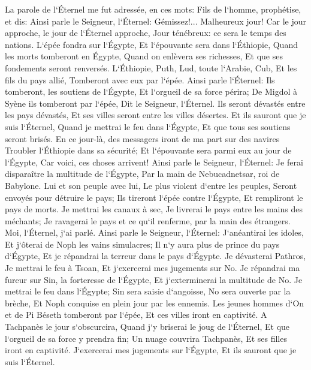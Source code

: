 \verse La parole de l`Éternel me fut adressée, en ces mots: 
\verse Fils de l`homme, prophétise, et dis: Ainsi parle le Seigneur, l`Éternel: Gémissez!... Malheureux jour! 
\verse Car le jour approche, le jour de l`Éternel approche, Jour ténébreux: ce sera le temps des nations. 
\verse L`épée fondra sur l`Égypte, Et l`épouvante sera dans l`Éthiopie, Quand les morts tomberont en Égypte, Quand on enlèvera ses richesses, Et que ses fondements seront renversés. 
\verse L`Éthiopie, Puth, Lud, toute l`Arabie, Cub, Et les fils du pays allié, Tomberont avec eux par l`épée. 
\verse Ainsi parle l`Éternel: Ils tomberont, les soutiens de l`Égypte, Et l`orgueil de sa force périra; De Migdol à Syène ils tomberont par l`épée, Dit le Seigneur, l`Éternel. 
\verse Ils seront dévastés entre les pays dévastés, Et ses villes seront entre les villes désertes. 
\verse Et ils sauront que je suis l`Éternel, Quand je mettrai le feu dans l`Égypte, Et que tous ses soutiens seront brisés. 
\verse En ce jour-là, des messagers iront de ma part sur des navires Troubler l`Éthiopie dans sa sécurité; Et l`épouvante sera parmi eux au jour de l`Égypte, Car voici, ces choses arrivent! 
\verse Ainsi parle le Seigneur, l`Éternel: Je ferai disparaître la multitude de l`Égypte, Par la main de Nebucadnetsar, roi de Babylone. 
\verse Lui et son peuple avec lui, Le plus violent d`entre les peuples, Seront envoyés pour détruire le pays; Ils tireront l`épée contre l`Égypte, Et rempliront le pays de morts. 
\verse Je mettrai les canaux à sec, Je livrerai le pays entre les mains des méchants; Je ravagerai le pays et ce qu`il renferme, par la main des étrangers. Moi, l`Éternel, j`ai parlé. 
\verse Ainsi parle le Seigneur, l`Éternel: J`anéantirai les idoles, Et j`ôterai de Noph les vains simulacres; Il n`y aura plus de prince du pays d`Égypte, Et je répandrai la terreur dans le pays d`Égypte. 
\verse Je dévasterai Pathros, Je mettrai le feu à Tsoan, Et j`exercerai mes jugements sur No. 
\verse Je répandrai ma fureur sur Sin, la forteresse de l`Égypte, Et j`exterminerai la multitude de No. 
\verse Je mettrai le feu dans l`Égypte; Sin sera saisie d`angoisse, No sera ouverte par la brèche, Et Noph conquise en plein jour par les ennemis. 
\verse Les jeunes hommes d`On et de Pi Béseth tomberont par l`épée, Et ces villes iront en captivité. 
\verse A Tachpanès le jour s`obscurcira, Quand j`y briserai le joug de l`Éternel, Et que l`orgueil de sa force y prendra fin; Un nuage couvrira Tachpanès, Et ses filles iront en captivité. 
\verse J`exercerai mes jugements sur l`Égypte, Et ils sauront que je suis l`Éternel. 
